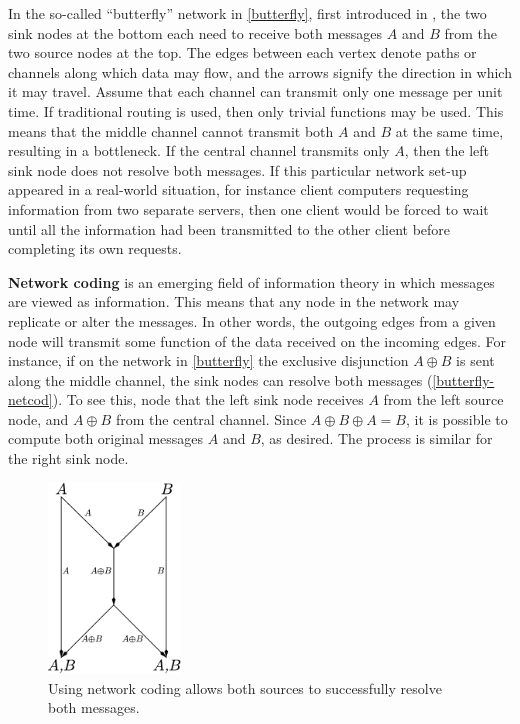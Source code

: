 In the so-called ``butterfly'' network in \autoref{butterfly}, first introduced in \cite{ahls2000}, the two sink nodes at the bottom each need to receive both messages $A$ and $B$ from the two source nodes at the top. The edges between each vertex denote paths or channels along which data may flow, and the arrows signify the direction in which it may travel. Assume that each channel can transmit only one message per unit time. If traditional routing is used, then only trivial functions may be used. This means that the middle channel cannot transmit both $A$ and $B$ at the same time, resulting in a bottleneck. If the central channel transmits only $A$, then the left sink node does not resolve both messages. If this particular network set-up appeared in a real-world situation, for instance client computers requesting information from two separate servers, then one client would be forced to wait until all the information had been transmitted to the other client before completing its own requests.

\textbf{Network coding} is an emerging field of information theory in which messages are viewed as information. This means that any node in the network may replicate or alter the messages. In other words, the outgoing edges from a given node will transmit some function of the data received on the incoming edges. For instance, if on the network in \autoref{butterfly} the exclusive disjunction $A \oplus B$ is sent along the middle channel, the sink nodes can resolve both messages (\autoref{butterfly-netcod}). To see this, node that the left sink node receives $A$ from the left source node, and $A \oplus B$ from the central channel. Since $A \oplus B \oplus A = B$, it is possible to compute both original messages $A$ and $B$, as desired. The process is similar for the right sink node.

\begin{figure}[ht]
	\centering
	\includegraphics[width=100pt]{figures/butterfly-netcod.pdf}
	\caption[The butterfly network using network coding]{Using network coding allows both sources to successfully resolve both messages.}
	\label{butterfly-netcod}
\end{figure}

